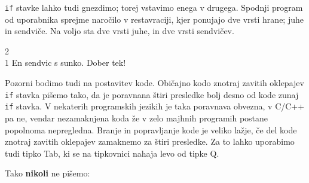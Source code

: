 \begin{examples}
\verb+if+ stavke lahko tudi gnezdimo; torej vstavimo enega v drugega.
Spodnji program od uporabnika sprejme naročilo v restavraciji, kjer ponujajo
dve vrsti hrane; juhe in sendviče. Na voljo sta dve vrsti juhe, in dve vrsti
sendvičev.


\begin{inout}
2\\
1
\tcblower
En sendvic s sunko. Dober tek!
\end{inout}
\end{examples}


\begin{errors}

Pozorni bodimo tudi na postavitev kode. Običajno kodo znotraj zavitih oklepajev
\verb+if+ stavka pišemo tako, da je poravnana štiri presledke bolj desno od
kode zunaj \verb+if+ stavka. V nekaterih programskih jezikih je taka poravnava
obvezna, v C/C++ pa ne, vendar nezamaknjena koda že v zelo majhnih programih
postane popolnoma nepregledna. Branje in popravljanje kode je veliko lažje, če
del kode znotraj zavitih oklepajev zamaknemo za štiri presledke. Za to lahko
uporabimo tudi tipko Tab, ki se na tipkovnici nahaja levo od tipke Q.

\vspace{0.3cm}
Tako \textbf{nikoli} ne pišemo:


\end{errors}

